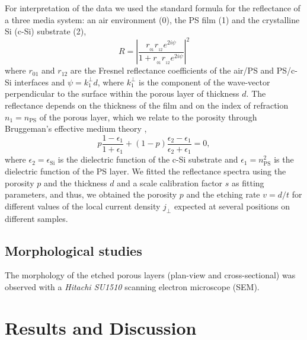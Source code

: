 \documentclass[review,sort&compress]{cas-sc}
\begin{document}
For interpretation of the data we used
the standard formula \cite{stenzel2015physics} for the reflectance of
a three media system:
an air environment  (0), the PS film (1) and the crystalline Si (c-Si) substrate (2),
\begin{equation}\label{Eq:ECMR}
  R=\left |\frac{r _ {_ {01}}r _ {_ {12}} e^{2i\psi}}{1+r _ {_
        {01}}r _ {_ {12}} e^{2i\psi}}\right |^2
\end{equation}
where $r_{01}$ and $r_{12}$ are the Fresnel reflectance
coefficients of the air/PS and PS/c-Si interfaces \cite{sattler2017silicon}
and $\psi=k_1^\perp d$, where $k_1^\perp$ is
the component of the wave-vector perpendicular to the surface within
the porous layer of thickness $d$. The reflectance depends on the
thickness of the film and on the index of refraction $n_1=n_{\text{PS}}$ of the porous
layer, which we relate to the porosity through Bruggeman's
effective medium theory \cite{theiss1997optical},
\begin{equation}\label{Eq:Brugg}
 p\frac{1-\epsilon_1} {1+\epsilon_1} + (1-p)
  \frac{\epsilon_2 - \epsilon_1}
  {\epsilon_2+\epsilon_1}=0,
\end{equation}
where $\epsilon_2=\epsilon_{\text{Si}}$ is the dielectric function of
the c-Si substrate and
$\epsilon_1=n_{\text{PS}}^2$ is the dielectric function of the PS layer.
We fitted the reflectance spectra using the porosity $p$ and the
thickness $d$ and a scale calibration factor $s$ as fitting
parameters, and thus, we obtained the porosity
$p$ and the etching rate $v=d/t$ for different values of the local
current density $j_\perp$ expected at several positions on different
samples.

\subsection{Morphological studies}

The morphology of the etched porous layers (plan-view and
cross-sectional) was observed with a {\em Hitachi SU1510} scanning electron microscope
(SEM).


\section{Results and Discussion}
\label{sec:discussion-results}
\end{document}
